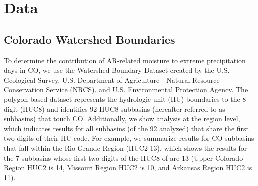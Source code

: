 \documentclass[draft]{agujournal2019}
\begin{document}






\section{Data}
\label{sec:data}
\subsection{Colorado Watershed Boundaries}
To determine the contribution of AR-related moisture to extreme precipitation days in CO, we use the Watershed Boundary Dataset created by the U.S. Geological Survey, U.S. Department of Agriculture - Natural Resource Conservation Service (NRCS), and U.S. Environmental Protection Agency. The polygon-based dataset represents the hydrologic unit (HU) boundaries to the 8-digit (HUC8) and identifies 92 HUC8 subbasins (hereafter referred to as subbasins) that touch CO. Additionally, we show analysis at the region level, which indicates results for all subbasins (of the 92 analyzed) that share the first two digits of their HU code. For example, we summarize results for CO subbasins that fall within the Rio Grande Region (HUC2 13), which shows the results for the 7 subbasins whose first two digits of the HUC8 of are 13 (Upper Colorado Region HUC2 is 14, Missouri Region HUC2 is 10, and Arkansas Region HUC2 is 11).
\end{document}
